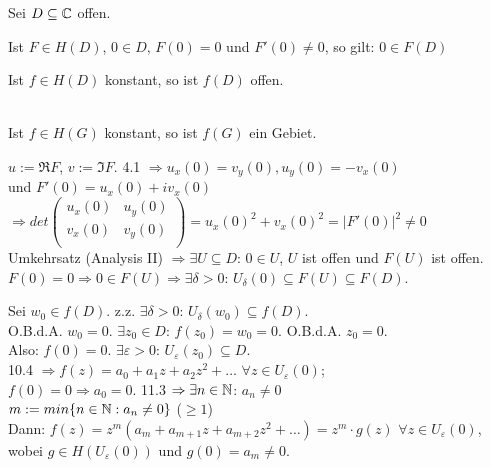 \documentclass[a4paper,twoside,DIV15,BCOR12mm]{scrbook}
\begin{document}
\begin{satz}
Sei $D \subseteq \mathbb{C}$ offen.
\begin{liste}
\item Ist $F \in H(D)$, $0 \in D$, $F(0) = 0$ und $F'(0) \neq 0$, so gilt: $0 \in F(D)$
\item Ist $f \in H(D)$  konstant, so ist $f(D)$ offen.
\item {}\\
Ist $f \in H(G)$  konstant, so ist $f(G)$ ein Gebiet.
\end{liste}
\end{satz}

\begin{beweis}
\begin{liste}
\item $u := \Re F$, $v := \Im F$. 4.1 $\Rightarrow u_x(0) = v_y(0), u_y(0) = - v_x(0)$ \\
und $F'(0) = u_x(0) + i v_x(0)$\\
$\Rightarrow det 
\left( \begin{array}{ccc}
u_x(0) & u_y(0) \\
v_x(0) & v_y(0) \\
\end{array} \right)
= u_x(0)^2 + v_x(0)^2 = |F'(0)|^2 \neq 0$\\
Umkehrsatz (Analysis II) $\Rightarrow \exists U \subseteq D$: $0 \in U$, $U$ ist offen und $F(U)$ ist offen.
$F(0) = 0 \Rightarrow 0 \in F(U) \Rightarrow \exists \delta > 0$: $U_{\delta}(0) \subseteq F(U) \subseteq F(D)$.
\item Sei $w_0 \in f(D)$. z.z. $\exists \delta > 0$: $U_{\delta}(w_0) \subseteq f(D)$.\\
O.B.d.A. $w_0 = 0$. $\exists z_0 \in D$: $f(z_0) = w_0 = 0$. O.B.d.A. $z_0 = 0$.\\
Also: $f(0) = 0$. $\exists \varepsilon > 0$: $U_{\varepsilon}(z_0) \subseteq D$.\\
10.4 $\Rightarrow f(z) = a_0 + a_1 z + a_2 z^2 + \dots$  $\forall z \in U_{\varepsilon}(0)$;\\
$f(0) = 0 \Rightarrow a_0 = 0$. 11.3 $\Rightarrow \exists n \in \mathbb{N}$: $a_n \neq 0$\\
$m:= min \{n \in \mathbb{N} : a_n \neq 0 \}$ ($\geq 1$)\\
Dann: $f(z) = z^m (a_m + a_{m+1} z + a_{m+2} z^2 + \dots) = z^m \cdot g(z)$  $\forall z \in U_{\varepsilon}(0)$,\\
wobei $g \in H(U_{\varepsilon}(0))$ und $g(0) = a_m \neq 0$.\\

\end{liste}
\end{beweis}
\end{document}
